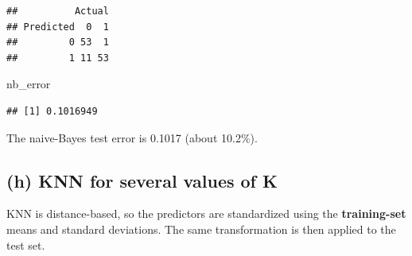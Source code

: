 \documentclass[
]{article}
\newenvironment{Shaded}{\begin{snugshade}}{\end{snugshade}}
\newcommand{\AttributeTok}[1]{\textcolor[rgb]{0.13,0.29,0.53}{#1}}
\newcommand{\FunctionTok}[1]{\textcolor[rgb]{0.13,0.29,0.53}{\textbf{#1}}}
\newcommand{\NormalTok}[1]{#1}
\newcommand{\OtherTok}[1]{\textcolor[rgb]{0.56,0.35,0.01}{#1}}
\newcommand{\SpecialCharTok}[1]{\textcolor[rgb]{0.81,0.36,0.00}{\textbf{#1}}}
\begin{document}
\begin{Shaded}
\end{Shaded}

\begin{verbatim}
##          Actual
## Predicted  0  1
##         0 53  1
##         1 11 53
\end{verbatim}

\begin{Shaded}
\begin{Highlighting}[]
\NormalTok{nb\_error}
\end{Highlighting}
\end{Shaded}

\begin{verbatim}
## [1] 0.1016949
\end{verbatim}

The naive-Bayes test error is 0.1017 (about 10.2\%).

\subsection{(h) KNN for several values of
K}\label{h-knn-for-several-values-of-k}

KNN is distance-based, so the predictors are standardized using the
\textbf{training-set} means and standard deviations. The same
transformation is then applied to the test set.
\end{document}
